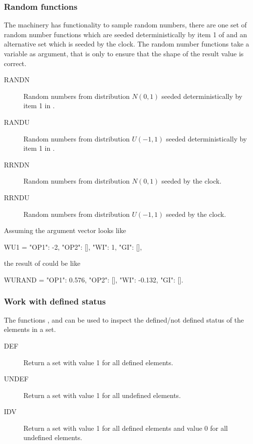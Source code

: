\subsubsection*{Random functions}
The \udq{} machinery has functionality to sample random numbers, there are one
set of random number functions which are seeded deterministically by item 1 of
 and an alternative set which is seeded by the clock. The random
number functions take a \udq{} variable as argument, that is only to ensure that
the shape of the result value is correct.

\begin{description}
\item[RANDN] Random numbers from distribution $N(0,1)$ seeded deterministically
  by item 1 in .
\item[RANDU] Random numbers from distribution $U(-1,1)$ seeded deterministically
  by item 1 in .
\item[RRNDN] Random numbers from distribution $N(0,1)$ seeded by the clock.
\item[RRNDU] Random numbers from distribution $U(-1,1)$ seeded by the clock.
\end{description}

Assuming the argument vector  looks like 
\begin{code}
  WU1 = {"OP1": -2, "OP2": [], "WI": 1, "GI": []},
\end{code}
the result of  could be like
\begin{code}
 WURAND = {"OP1": 0.576, "OP2": [], "WI": -0.132, "GI": []}.
\end{code}

\subsubsection*{Work with defined status}
The functions ,  and  can be used to inspect the
defined/not defined status of the elements in a \udq{} set.

\begin{description}
  \item[DEF] Return a set with value 1 for all defined elements.
  \item[UNDEF] Return a set with value 1 for all undefined elements.
  \item[IDV] Return a set with value 1 for all defined elements and value 0 for
    all undefined elements.
\end{description}

